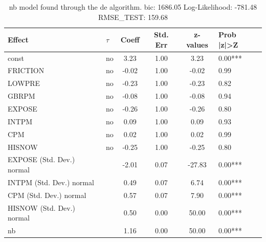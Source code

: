 \begin{table}
	\caption{nb model found through the de algorithm. bic: 1686.05 Log-Likelihood: -781.48 RMSE_TEST: 159.68}
	\begin{center}
		\begin{tabular}{|l|l|c|c|c|l|}
			\hline
			Effect & $\tau$ & Coeff & Std. Err & z-values & Prob |z|>Z \\
			\hline
			const & no & 3.23 & 1.00 & 3.23 & 0.00*** \\
			\hline
			FRICTION & no & -0.02 & 1.00 & -0.02 & 0.99 \\
			\hline
			LOWPRE & no & -0.23 & 1.00 & -0.23 & 0.82 \\
			\hline
			GBRPM & no & -0.08 & 1.00 & -0.08 & 0.94 \\
			\hline
			EXPOSE & no & -0.26 & 1.00 & -0.26 & 0.80 \\
			\hline
			INTPM & no & 0.09 & 1.00 & 0.09 & 0.93 \\
			\hline
			CPM & no & 0.02 & 1.00 & 0.02 & 0.99 \\
			\hline
			HISNOW & no & -0.25 & 1.00 & -0.25 & 0.80 \\
			\hline
			EXPOSE (Std. Dev.) normal &  & -2.01 & 0.07 & -27.83 & 0.00*** \\
			\hline
			INTPM (Std. Dev.) normal &  & 0.49 & 0.07 & 6.74 & 0.00*** \\
			\hline
			CPM (Std. Dev.) normal &  & 0.57 & 0.07 & 7.90 & 0.00*** \\
			\hline
			HISNOW (Std. Dev.) normal &  & 0.50 & 0.00 & 50.00 & 0.00*** \\
			\hline
			nb &  & 1.16 & 0.00 & 50.00 & 0.00*** \\
			\hline
		\end{tabular}
	\end{center}
\end{table}